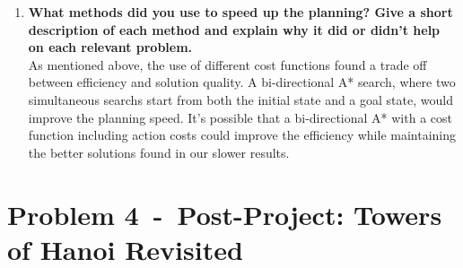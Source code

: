 \documentclass[12pt]{article}
\newcommand{\problem}[2]{\section*{Problem {#1}~-~{#2}}}
\begin{document}
\begin{enumerate}
  \item \textbf{What methods did you use to speed up the planning? Give a short description of each method and explain why it did or didn't help on each relevant problem.}\\
  As mentioned above, the use of different cost functions found a trade off between efficiency and solution quality. A bi-directional A* search, where two simultaneous searchs start from both the initial state and a goal state, would improve the planning speed. It's possible that a bi-directional A* with a cost function including action costs could improve the efficiency while maintaining the better solutions found in our slower results.
\end{enumerate}

\problem{4}{Post-Project: Towers of Hanoi Revisited}
\label{sec:problem_4}
\end{document}
